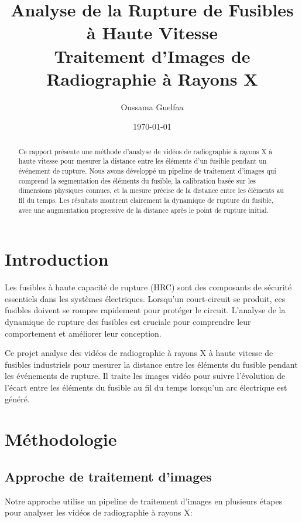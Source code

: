 \documentclass[12pt,a4paper]{article}
\title{Analyse de la Rupture de Fusibles à Haute Vitesse\\
\large Traitement d'Images de Radiographie à Rayons X}
\author{Oussama Guelfaa}
\date{\today}
\begin{document}
\maketitle

\begin{abstract}
Ce rapport présente une méthode d'analyse de vidéos de radiographie à rayons X à haute vitesse pour mesurer la distance entre les éléments d'un fusible pendant un événement de rupture. Nous avons développé un pipeline de traitement d'images qui comprend la segmentation des éléments du fusible, la calibration basée sur les dimensions physiques connues, et la mesure précise de la distance entre les éléments au fil du temps. Les résultats montrent clairement la dynamique de rupture du fusible, avec une augmentation progressive de la distance après le point de rupture initial.
\end{abstract}

\tableofcontents

\newpage

\section{Introduction}

Les fusibles à haute capacité de rupture (HRC) sont des composants de sécurité essentiels dans les systèmes électriques. Lorsqu'un court-circuit se produit, ces fusibles doivent se rompre rapidement pour protéger le circuit. L'analyse de la dynamique de rupture des fusibles est cruciale pour comprendre leur comportement et améliorer leur conception.

Ce projet analyse des vidéos de radiographie à rayons X à haute vitesse de fusibles industriels pour mesurer la distance entre les éléments du fusible pendant les événements de rupture. Il traite les images vidéo pour suivre l'évolution de l'écart entre les éléments du fusible au fil du temps lorsqu'un arc électrique est généré.

\section{Méthodologie}

\subsection{Approche de traitement d'images}

Notre approche utilise un pipeline de traitement d'images en plusieurs étapes pour analyser les vidéos de radiographie à rayons X:
\end{document}
